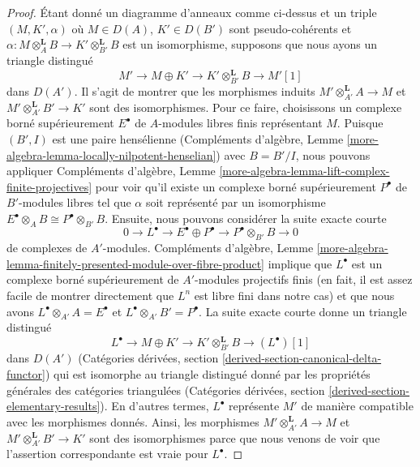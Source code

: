 \begin{proof}
\medskip\noindent
Étant donné un diagramme d'anneaux comme ci-dessus et un triple
$(M, K', \alpha)$ où $M \in D(A)$, $K' \in D(B')$ sont
pseudo-cohérents et
$\alpha : M \otimes_A^\mathbf{L} B \to K' \otimes_{B'}^\mathbf{L} B$
est un isomorphisme, supposons que nous ayons un triangle distingué
$$
M' \to M \oplus K' \to K' \otimes_{B'}^\mathbf{L} B \to M'[1]
$$
dans $D(A')$. Il s'agit de montrer que les morphismes induits
$M' \otimes_{A'}^\mathbf{L} A \to M$ et
$M' \otimes_{A'}^\mathbf{L} B' \to K'$ sont des isomorphismes.
Pour ce faire, choisissons un complexe borné supérieurement
$E^\bullet$ de $A$-modules libres finis représentant $M$.
Puisque $(B', I)$ est une paire hensélienne
(Compléments d'algèbre, Lemme \ref{more-algebra-lemma-locally-nilpotent-henselian})
avec $B = B'/I$, nous pouvons appliquer Compléments d'algèbre, Lemme
\ref{more-algebra-lemma-lift-complex-finite-projectives}
pour voir qu'il existe un complexe borné supérieurement $P^\bullet$
de $B'$-modules libres tel que $\alpha$ soit représenté
par un isomorphisme $E^\bullet \otimes_A B \cong P^\bullet \otimes_{B'} B$.
Ensuite, nous pouvons considérer la suite exacte courte
$$
0 \to L^\bullet \to
E^\bullet \oplus P^\bullet \to P^\bullet \otimes_{B'} B \to 0
$$
de complexes de $A'$-modules.  
Compléments d'algèbre, Lemme  
\ref{more-algebra-lemma-finitely-presented-module-over-fibre-product}  
implique que $L^\bullet$ est un complexe borné supérieurement de  
$A'$-modules projectifs finis  
(en fait, il est assez facile de montrer directement que $L^n$ est libre fini  
dans notre cas) et que nous avons  
$L^\bullet \otimes_{A'} A = E^\bullet$ et  
$L^\bullet \otimes_{A'} B' = P^\bullet$.  
La suite exacte courte donne un triangle distingué  
$$
L^\bullet \to M \oplus K' \to K' \otimes_{B'}^\mathbf{L} B \to (L^\bullet)[1]
$$  
dans $D(A')$ (Catégories dérivées, section  
\ref{derived-section-canonical-delta-functor}) qui est isomorphe  
au triangle distingué donné par les propriétés générales des  
catégories triangulées (Catégories dérivées, section  
\ref{derived-section-elementary-results}). En d'autres termes, $L^\bullet$  
représente $M'$ de manière compatible avec les morphismes donnés. Ainsi, les morphismes  
$M' \otimes_{A'}^\mathbf{L} A \to M$ et  
$M' \otimes_{A'}^\mathbf{L} B' \to K'$ sont  
des isomorphismes parce que nous venons de voir que l'assertion correspondante est vraie pour $L^\bullet$.  
\end{proof}







